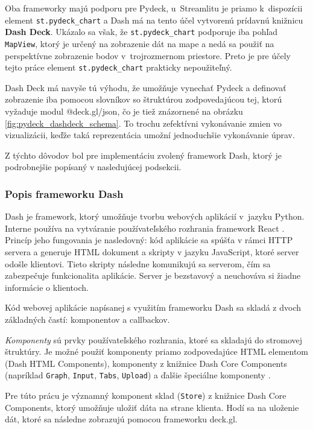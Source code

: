 Oba frameworky majú podporu pre Pydeck, u~Streamlitu je priamo k~dispozícii element \texttt{st.pydeck\_chart} a Dash má na tento účel vytvorenú prídavnú knižnicu \textbf{Dash Deck}. Ukázalo sa však, že \texttt{st.pydeck\_chart} podporuje iba pohľad \texttt{MapView}, ktorý je určený na zobrazenie dát na mape a nedá sa použiť na perspektívne zobrazenie bodov v~trojrozmernom priestore. Preto je pre účely tejto práce element \texttt{st.pydeck\_chart} prakticky nepoužiteľný.

Dash Deck má navyše tú výhodu, že umožňuje vynechať Pydeck a definovať zobrazenie iba pomocou slovníkov so štruktúrou zodpovedajúcou tej, ktorú vyžaduje modul @deck.gl/json, čo je tiež znázornené na obrázku \ref{fig:pydeck_dashdeck_schema}. To trochu zefektívni vykonávanie zmien vo vizualizácii, keďže taká reprezentácia umožní jednoduchšie vykonávanie úprav.

Z týchto dôvodov bol pre implementáciu zvolený framework Dash, ktorý je podrobnejšie popísaný v nasledujúcej podsekcii.

\subsubsection{Popis frameworku Dash}

Dash je framework, ktorý umožňuje tvorbu webových aplikácií v~jazyku Python. Interne používa na vytváranie používateľského rozhrania framework React \cite{dash_documentation}. Princíp jeho fungovania je nasledovný: kód aplikácie sa spúšťa v rámci HTTP servera a generuje HTML dokument a skripty v jazyku JavaScript, ktoré server odošle klientovi. Tieto skripty následne komunikujú sa serverom, čím sa zabezpečuje funkcionalita aplikácie. Server je bezstavový a neuchováva si žiadne informácie o klientoch.

Kód webovej aplikácie napísanej s využitím frameworku Dash sa skladá z dvoch základných častí: komponentov a callbackov.

\emph{Komponenty} sú prvky používateľského rozhrania, ktoré sa skladajú do stromovej štruktúry. Je možné použiť komponenty priamo zodpovedajúce HTML elementom (Dash HTML Components), komponenty z knižnice Dash Core Components (napríklad \texttt{Graph}, \texttt{Input}, \texttt{Tabs}, \texttt{Upload}) a ďalšie špeciálne komponenty \cite{dash_documentation}.

Pre túto prácu je významný komponent sklad (\texttt{Store}) z knižnice Dash Core Components, ktorý umožňuje uložiť dáta na strane klienta. Hodí sa na uloženie dát, ktoré sa následne zobrazujú pomocou frameworku deck.gl.

